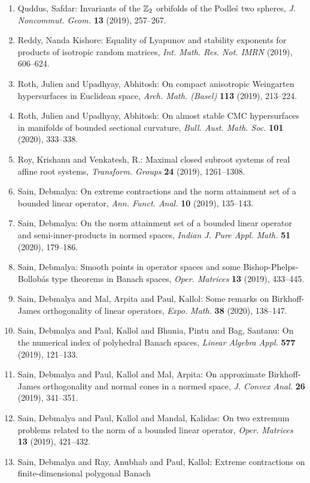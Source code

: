 \begin{enumerate}
\item Quddus, Safdar: Invariants of the {$\Bbb Z_2$} orbifolds of the {P}odle\'{s} two
spheres, \emph{J. Noncommut. Geom.} {\bf 13} (2019), 257--267.
\item Reddy, Nanda Kishore: Equality of {L}yapunov and stability exponents for products of
isotropic random matrices, \emph{Int. Math. Res. Not. IMRN} {\bf } (2019), 606--624.
\item Roth, Julien and Upadhyay, Abhitosh: On compact anisotropic {W}eingarten hypersurfaces in
{E}uclidean space, \emph{Arch. Math. (Basel)} {\bf 113} (2019), 213--224.
\item Roth, Julien and Upadhyay, Abhitosh: On almost stable {CMC} hypersurfaces in manifolds of bounded
sectional curvature, \emph{Bull. Aust. Math. Soc.} {\bf 101} (2020), 333--338.
\item Roy, Krishanu and Venkatesh, R.: Maximal closed subroot systems of real affine root systems, \emph{Transform. Groups} {\bf 24} (2019), 1261--1308.
\item Sain, Debmalya: On extreme contractions and the norm attainment set of a
bounded linear operator, \emph{Ann. Funct. Anal.} {\bf 10} (2019), 135--143.
\item Sain, Debmalya: On the norm attainment set of a bounded linear operator and
semi-inner-products in normed spaces, \emph{Indian J. Pure Appl. Math.} {\bf 51} (2020), 179--186.
\item Sain, Debmalya: Smooth points in operator spaces and some
{B}ishop-{P}helps-{B}ollob\'{a}s type theorems in {B}anach spaces, \emph{Oper. Matrices} {\bf 13} (2019), 433--445.
\item Sain, Debmalya and Mal, Arpita and Paul, Kallol: Some remarks on {B}irkhoff-{J}ames orthogonality of linear
operators, \emph{Expo. Math.} {\bf 38} (2020), 138--147.
\item Sain, Debmalya and Paul, Kallol and Bhunia, Pintu and Bag,
Santanu: On the numerical index of polyhedral {B}anach spaces, \emph{Linear Algebra Appl.} {\bf 577} (2019), 121--133.
\item Sain, Debmalya and Paul, Kallol and Mal, Arpita: On approximate {B}irkhoff-{J}ames orthogonality and normal
cones in a normed space, \emph{J. Convex Anal.} {\bf 26} (2019), 341--351.
\item Sain, Debmalya and Paul, Kallol and Mandal, Kalidas: On two extremum problems related to the norm of a bounded
linear operator, \emph{Oper. Matrices} {\bf 13} (2019), 421--432.
\item Sain, Debmalya and Ray, Anubhab and Paul, Kallol: Extreme contractions on finite-dimensional polygonal {B}anach

\end{enumerate}
